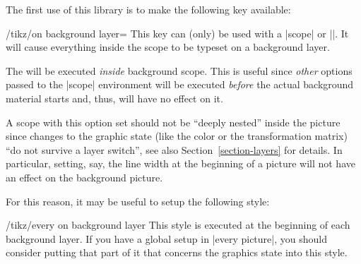 The first use of this library is to make the following key available:
%
\begin{key}{/tikz/on background layer=}
    This key can (only) be used with a |{scope}| or |\scoped|. It will cause
    everything inside the scope to be typeset on a background layer.

    The  will be executed \emph{inside} background scope. This is
    useful since \emph{other} options passed to the |{scope}| environment will
    be executed \emph{before} the actual background material starts and, thus,
    will have no effect on it.
\begin{codeexample}[preamble={\usetikzlibrary{backgrounds}}]
\end{codeexample}

    A scope with this option set should not be ``deeply nested'' inside the
    picture since changes to the graphic state (like the color or the
    transformation matrix) ``do not survive a layer switch'', see also
    Section~\ref{section-layers} for details. In particular, setting, say, the
    line width at the beginning of a picture will not have an effect on the
    background picture.

    For this reason, it may be useful to setup the following style:
    \begin{stylekey}{/tikz/every on background layer}
        This style is executed at the beginning of each background layer. If
        you have a global setup in |every picture|, you should consider putting
        that part of it that concerns the graphics state into this style.
\begin{codeexample}[preamble={\usetikzlibrary{backgrounds}}]
\end{codeexample}
    \end{stylekey}
\end{key}

